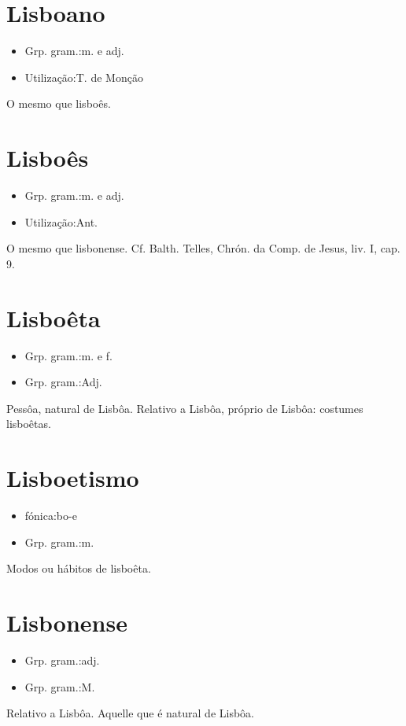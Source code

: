 \section{Lisboano}
\begin{itemize}
\item {Grp. gram.:m.  e  adj.}
\end{itemize}
\begin{itemize}
\item {Utilização:T. de Monção}
\end{itemize}
O mesmo que \textunderscore lisboês\textunderscore .
\section{Lisboês}
\begin{itemize}
\item {Grp. gram.:m.  e  adj.}
\end{itemize}
\begin{itemize}
\item {Utilização:Ant.}
\end{itemize}
O mesmo que \textunderscore lisbonense\textunderscore . Cf. Balth. Telles, \textunderscore Chrón. da Comp. de Jesus\textunderscore , liv. I, cap. 9.
\section{Lisboêta}
\begin{itemize}
\item {Grp. gram.:m.  e  f.}
\end{itemize}
\begin{itemize}
\item {Grp. gram.:Adj.}
\end{itemize}
Pessôa, natural de Lisbôa.
Relativo a Lisbôa, próprio de Lisbôa: \textunderscore costumes lisboêtas\textunderscore .
\section{Lisboetismo}
\begin{itemize}
\item {fónica:bo-e}
\end{itemize}
\begin{itemize}
\item {Grp. gram.:m.}
\end{itemize}
Modos ou hábitos de lisboêta.
\section{Lisbonense}
\begin{itemize}
\item {Grp. gram.:adj.}
\end{itemize}
\begin{itemize}
\item {Grp. gram.:M.}
\end{itemize}
Relativo a Lisbôa.
Aquelle que é natural de Lisbôa.
